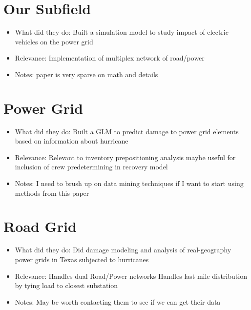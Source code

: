\documentclass{article}
\begin{document}
	
	\section{Our Subfield}
	\cite{YangEA2018}
	\begin{itemize}
		\item What did they do: \newline
		Built a simulation model to study impact of electric vehicles on the power grid
		\item Relevance: \newline
		Implementation of multiplex network of road/power 
		\item Notes: \newline
		paper is very sparse on math and details 
	\end{itemize}
	
	\section{Power Grid}
	\cite{GuikemaEA2010}
		\begin{itemize}
		\item What did they do: \newline
		Built a GLM to predict damage to power grid elements based on information about hurricane
		\item Relevance: \newline
		Relevant to inventory prepositioning analysis \newline
		maybe useful for inclusion of crew predetermining in recovery model
		\item Notes: \newline
		I need to brush up on data mining techniques if I want to start using methods from this paper
	\end{itemize}
	\section{Road Grid}
	\cite{WinklerEA2010}
	\begin{itemize}
		\item What did they do: \newline
		Did damage modeling and analysis of real-geography power grids in Texas subjected to hurricanes
		\item Relevance: \newline
		Handles dual Road/Power networks \newline
		Handles last mile distribution by tying load to closest substation 
		\item Notes: \newline
		May be worth contacting them to see if we can get their data
	\end{itemize}
\end{document}
